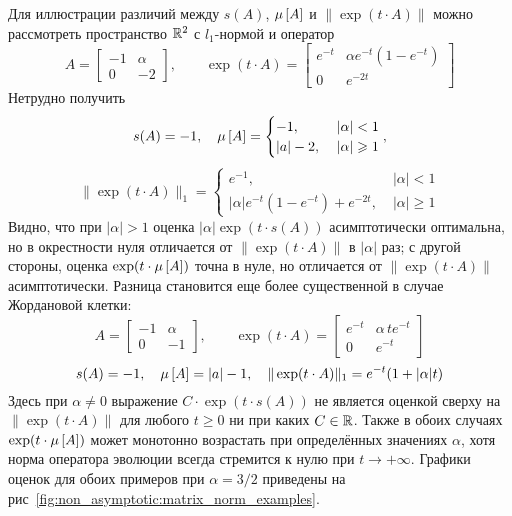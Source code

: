 Для иллюстрации различий между $ s(A) $, $ \mu \left[ A \right] $ и $ \| \exp(t \cdot A) \| $
можно рассмотреть пространство $ \mathbb{R}^2 $ с $ l_1 $-нормой и оператор
\begin{equation}
    \label{eq:non_asymptotic:matrix_1}
    A =
    \begin{bmatrix}
        -1 & \alpha \\
        0 & -2
    \end{bmatrix},
    \qquad
    \exp(t \cdot A) =
    \begin{bmatrix}
        e^{-t} & \alpha e^{-t} (1 - e^{-t}) \\
        0 & e^{-2 t}
    \end{bmatrix}
\end{equation}
Нетрудно получить
\[
    s(A) = -1, \quad
    \mu \left[ A \right] =
    \begin{cases}
        -1, &\; |\alpha| < 1 \\
        |a| - 2, &\; |\alpha| \geqslant 1
    \end{cases},
\]
\[
    \| \exp(t \cdot A) \|_1 =
    \begin{cases}
        e^{-1}, &\; |\alpha| < 1 \\
        |\alpha| e^{-t}(1 - e^{-t}) + e^{-2t}, &\; |\alpha| \geqslant 1
    \end{cases}
\]
Видно, что при $ |\alpha| > 1 $ оценка $ |\alpha| \exp(t \cdot s(A)) $ асимптотически оптимальна,
но в окрестности нуля отличается от $ \| \exp(t \cdot A) \| $ в $ |\alpha| $ раз;
с другой стороны, оценка $ \exp(t \cdot \mu \left[ A \right]) $ точна в нуле,
но отличается от $ \| \exp(t \cdot A) \| $ асимптотически.
Разница становится еще более существенной в случае Жордановой клетки:
\begin{equation}
    \label{eq:non_asymptotic:matrix_2}
    A =
    \begin{bmatrix}
        -1 & \alpha \\
        0 & -1
    \end{bmatrix},
    \qquad
    \exp(t \cdot A) =
    \begin{bmatrix}
        e^{-t} & \alpha \, t e^{-t} \\
        0 & e^{-t}
    \end{bmatrix}
\end{equation}
\[
    s(A) = -1, \quad
    \mu \left[ A \right] = |a| - 1, \quad
    \| \exp(t \cdot A) \|_1 = e^{-t} (1 + |\alpha| t)
\]
Здесь при $ \alpha \neq 0 $ выражение $ C \cdot \exp(t \cdot s(A)) $ не является оценкой сверху на $ \| \exp(t \cdot A) \| $
для любого $ t \geqslant 0 $ ни при каких $ C \in \mathbb{R} $.
Также в обоих случаях $ \exp(t \cdot \mu \left[ A \right]) $ может монотонно возрастать при определённых значениях $ \alpha $,
хотя норма оператора эволюции всегда стремится к нулю при $ t \to +\infty $.
Графики оценок для обоих примеров при $ \alpha = 3/2 $ приведены на рис~\ref{fig:non_asymptotic:matrix_norm_examples}.

